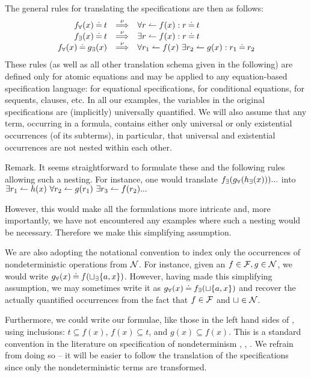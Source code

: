 The general rules for translating the specifications are then as follows: \begin{equation}\label{eq:isresult}
\begin{array}{rcl}
\Bre f(x) \Eq t & \TTo{\nu} & \forall r\isres f(x) : r\Eq t\\ \Bree f(x) \Eq t & \TTo{\nu} & \exists r\isres f(x) : r\Eq t \\ \Bre f(x) \Eq \Bree g(x) & \TTo{\nu} & \forall r_1\isres f(x)\ \exists r_2\isres g(x): r_1\Eq r_2
\end{array}
\end{equation}
These rules (as well as all other translation schema given in the following) are defined only for atomic equations and may be applied
to any equation-based specification language: for equational specifications,
for conditional equations, for sequents, clauses, etc. In all our examples,
the variables in the original specifications are (implicitly) universally
quantified. We will also assume that 
any term, occurring in a formula, contains either only universal or only
existential occurrences (of its subterms), in particular, that
universal and existential occurrences are not nested within each other.
\begin{SREMARK}{Remark.}
It seems straightforward to formulate these and the following rules allowing such a nesting.
For instance, one would translate $f_\exists(g_\forall(h_\exists(x)))...$ into $\exists r_1\leftharpoonup h(x)\ \forall r_2\leftharpoonup g(r_1)\ \exists r_3\leftharpoonup f(r_2)...$

However, this would make all the formulations more intricate and, more
importantly, we have not encountered any examples where such a nesting would
be necessary. Therefore we make this simplifying assumption. 

We are also adopting the notational convention to index only the occurrences of
nondeterministic operations from $\cal N$. For instance, given an
 $f\in{\cal F}, g\in \cal N$, we would write $g_\forall(x)\mathbin{\doteq}
 f(\sqcup_\exists\{a,x\})$. However, having made this simplifying assumption,
 we may sometimes write it as $g_\forall(x)\mathbin{\doteq} f_\exists(\sqcup\{a,x\})$
 and recover the actually quantified occurrences from the fact that
 $f\in{\cal F}$ and $\sqcup \in \cal N$. 

Furthermore, we could write our formulae, like those in the left hand
sides of , using inclusions: $t\subseteq f(x)$,
 $f(x)\subseteq t$, and $g(x)\subseteq f(x)$. This is a standard convention
 in the literature on specification of nondeterminism \cite{HusB},
 \cite{Mos}, \cite{top}. We refrain from doing so -- it will be
 easier to follow the translation of the specifications since only the
 nondeterministic terms are transformed. 
\end{SREMARK}
